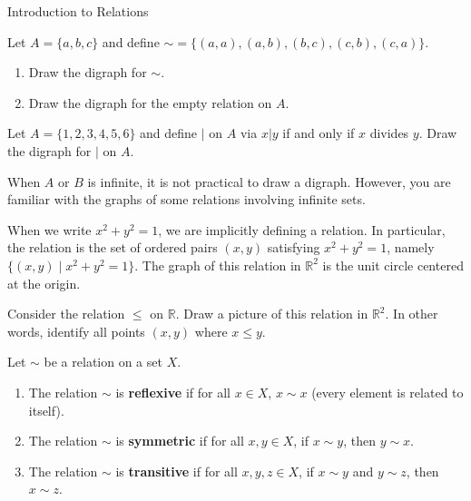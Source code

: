 \begin{section}{Introduction to Relations}
\begin{example}
\end{example}

\begin{problem}
Let $A=\{a,b,c\}$ and define ${\sim}=\{(a,a),(a,b),(b,c),(c,b),(c,a)\}$.  
\begin{enumerate}[label=\textrm{(\alph*)}]
\item Draw the digraph for $\sim$.
\item Draw the digraph for the empty relation on $A$.
\end{enumerate}
\end{problem}

\begin{problem}
Let $A=\{1,2,3,4,5,6\}$ and define $|$ on $A$ via $x|y$ if and only if $x$ divides $y$.  Draw the digraph for $|$ on $A$.
\end{problem}

When $A$ or $B$ is infinite, it is not practical to draw a digraph.  However, you are familiar with the graphs of some relations involving infinite sets.

\begin{example}
When we write $x^2+y^2=1$, we are implicitly defining a relation.  In particular, the relation is the set of ordered pairs $(x,y)$ satisfying $x^2+y^2=1$, namely $\{(x,y)\mid x^2+y^2=1\}$. The graph of this relation in $\mathbb{R}^2$ is the unit circle centered at the origin.
\end{example}

\begin{problem}
Consider the relation $\leq$ on $\mathbb{R}$. Draw a picture of this relation in $\mathbb{R}^2$. In other words, identify all points $(x,y)$ where $x\leq y$.
\end{problem}

\begin{definition}
Let $\sim$ be a relation on a set $X$.
\begin{enumerate}[label=\textrm{(\alph*)}]
\item The relation $\sim$ is \textbf{reflexive} if for all $x\in X$, $x\sim x$ (every element is related to itself).
\item The relation $\sim$ is \textbf{symmetric} if for all $x,y\in X$, if $x\sim y$, then $y\sim x$.
\item The relation $\sim$ is \textbf{transitive} if for all $x,y,z\in X$, if $x\sim y$ and $y\sim z$, then $x\sim z$.
\end{enumerate}
\end{definition}


\end{section}
